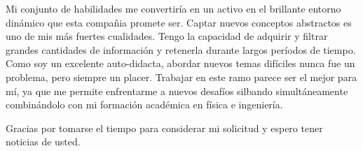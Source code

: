 \documentclass[10pt,stdletter,dateno,sigleft]{newlfm} %
\begin{document}
\begin{newlfm}
Mi conjunto de habilidades me convertiría en un activo en el brillante entorno dinámico que esta compañia promete ser. Captar nuevos conceptos abstractos es uno de mis más fuertes cualidades. Tengo la capacidad de adquirir y filtrar grandes cantidades de información y retenerla durante largos períodos de tiempo. Como soy un excelente auto-didacta, abordar nuevos temas difíciles nunca fue un problema, pero siempre un placer. Trabajar en este ramo parece ser el mejor para mí, ya que me permite enfrentarme a nuevos desafíos silbando simultáneamente combinándolo con mi formación académica en física e ingeniería.


Gracias por tomarse el tiempo para considerar mi solicitud y espero tener noticias de usted.


\end{newlfm}
\end{document}
